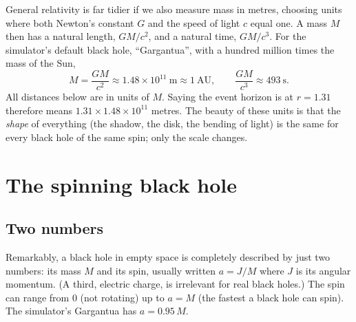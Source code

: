 \documentclass[11pt,a4paper]{article}
\begin{document}
General relativity is far tidier if we also measure mass in metres, choosing units where
both Newton's constant $G$ and the speed of light $c$ equal one. A mass $M$ then has a
natural length, $GM/c^2$, and a natural time, $GM/c^3$. For the simulator's default black
hole, ``Gargantua'', with a hundred million times the mass of the Sun,
\begin{equation}
  M = \frac{GM}{c^2} \approx 1.48\times 10^{11}\ \text{m} \approx 1\ \text{AU},
  \qquad \frac{GM}{c^3} \approx 493\ \text{s}.
\end{equation}
All distances below are in units of $M$. Saying the event horizon is at $r = 1.31$
therefore means $1.31 \times 1.48\times10^{11}$ metres. The beauty of these units is that
the \emph{shape} of everything (the shadow, the disk, the bending of light) is the same for
every black hole of the same spin; only the scale changes.

\section{The spinning black hole}\label{sec:kerr}

\subsection{Two numbers}

Remarkably, a black hole in empty space is completely described by just two numbers: its
mass $M$ and its spin, usually written $a = J/M$ where $J$ is its angular momentum. (A
third, electric charge, is irrelevant for real black holes.) The spin can range from $0$
(not rotating) up to $a = M$ (the fastest a black hole can spin). The simulator's Gargantua
has $a = 0.95\,M$.
\end{document}
